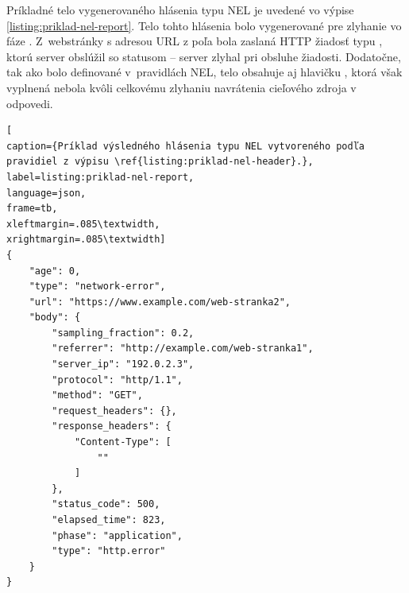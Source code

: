 Príkladné telo vygenerovaného hlásenia typu NEL je uvedené vo výpise \ref{listing:priklad-nel-report}. 
Telo tohto hlásenia bolo vygenerované pre zlyhanie vo fáze . \mbox{Z webstránky} s adresou URL z poľa  bola zaslaná HTTP žiadosť typu , ktorú server obslúžil so statusom  -- server zlyhal pri obsluhe žiadosti. Dodatočne, tak ako bolo definované \mbox{v pravidlách} NEL, telo obsahuje aj hlavičku , ktorá však vyplnená nebola kvôli celkovému zlyhaniu navrátenia cieľového zdroja v odpovedi.

\pagebreak

\begin{center}
\centering
\begin{lstlisting}[
caption={Príklad výsledného hlásenia typu NEL vytvoreného podľa pravidiel z výpisu \ref{listing:priklad-nel-header}.},
label=listing:priklad-nel-report, 
language=json, 
frame=tb,
xleftmargin=.085\textwidth, 
xrightmargin=.085\textwidth]
{
    "age": 0,
    "type": "network-error",
    "url": "https://www.example.com/web-stranka2",
    "body": {
        "sampling_fraction": 0.2,
        "referrer": "http://example.com/web-stranka1",
        "server_ip": "192.0.2.3",
        "protocol": "http/1.1",
        "method": "GET",
        "request_headers": {},
        "response_headers": {
            "Content-Type": [
                ""
            ]
        },
        "status_code": 500,
        "elapsed_time": 823,
        "phase": "application",
        "type": "http.error"
    }
}
\end{lstlisting}
\end{center}
